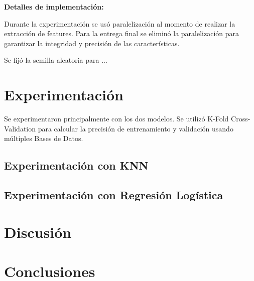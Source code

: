 \documentclass[conference]{IEEEtran}
\begin{document}
\textbf{Detalles de implementación:}

Durante la experimentación se usó paralelización al momento de realizar la extracción de features. Para la entrega final se eliminó la paralelización para garantizar la integridad y precisión de las características.

Se fijó la semilla aleatoria para ...

\section{Experimentación}
Se experimentaron principalmente con los dos modelos. Se utilizó K-Fold Cross-Validation para calcular la precisión de entrenamiento y validación usando múltiples Bases de Datos.

\subsection{Experimentación con KNN}

\subsection{Experimentación con Regresión Logística}


\section{Discusión}


\section{Conclusiones}
\end{document}
